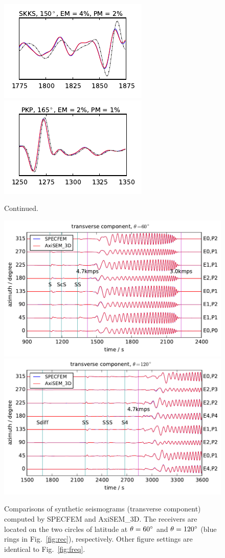 \documentclass[extra,referee]{gji}
\begin{document}
\begin{figure}
  \includegraphics[width=.25\textwidth]{fig/section/15.pdf}\hspace{-5pt}
  \includegraphics[width=.25\textwidth]{fig/section/16.pdf}\vspace{-5pt}
  \caption{Continued.}
\end{figure} 

\begin{figure}
  \centering
  \includegraphics[width=.49\textwidth]{fig/ring/VIR_s3_11_60.pdf}\vspace{-5pt}
  \includegraphics[width=.49\textwidth]{fig/ring/VIR_s3_11_120.pdf}\vspace{-5pt}
  \caption{Comparisons of synthetic seismograms (transverse component) computed 
  by SPECFEM and AxiSEM\_3D. The receivers are located on the two circles of latitude 
  at $\theta=60\hbox{$^\circ$}$ and $\theta=120\hbox{$^\circ$}$ (blue rings in Fig.~\ref{fig:rec}), 
  respectively. Other figure settings are identical to Fig.~\ref{fig:freq}.}
  \label{fig:freq2}
\end{figure}  
\end{document}
